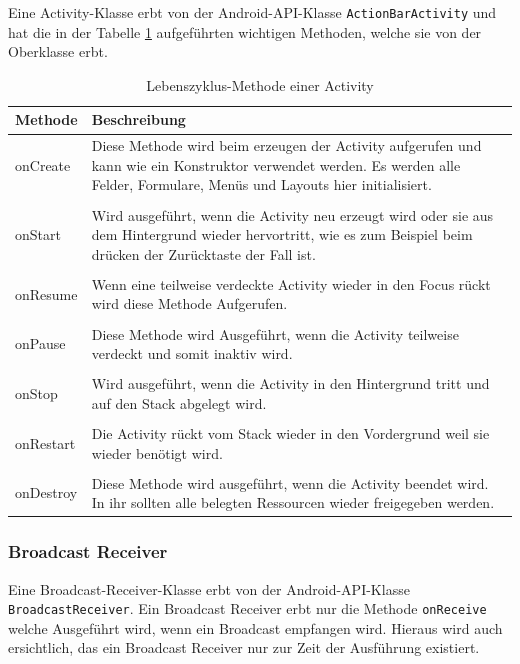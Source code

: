 Eine Activity-Klasse erbt von der Android-API-Klasse \texttt{ActionBarActivity} und hat die in der Tabelle \ref{Lebenszyklus-Methode einer Activity} aufgef\"uhrten wichtigen Methoden, welche sie von der Oberklasse erbt.

\begin{table}[!ht]
\begin{tabular}{|p{3cm}|p{12cm}|}
 \hline Methode & Beschreibung \\
 \hline onCreate & Diese Methode wird beim erzeugen der Activity aufgerufen und kann wie ein Konstruktor verwendet werden. Es werden alle Felder, Formulare, Men\"us und Layouts hier initialisiert.\\&\\
 onStart & Wird ausgef\"uhrt, wenn die Activity neu erzeugt wird oder sie aus dem Hintergrund wieder hervortritt, wie es zum Beispiel beim dr\"ucken der Zur\"ucktaste der Fall ist.\\&\\
 onResume & Wenn eine teilweise verdeckte Activity wieder in den Focus r\"uckt wird diese Methode Aufgerufen.\\&\\
 onPause & Diese Methode wird Ausgef\"uhrt, wenn die Activity teilweise verdeckt und somit inaktiv wird.\\&\\
 onStop & Wird ausgef\"uhrt, wenn die Activity in den Hintergrund tritt und auf den Stack abgelegt wird.\\&\\
 onRestart & Die Activity r\"uckt vom Stack wieder in den Vordergrund weil sie wieder ben\"otigt wird.\\&\\
 onDestroy & Diese Methode wird ausgef\"uhrt, wenn die Activity beendet wird. In ihr sollten alle belegten Ressourcen wieder freigegeben werden.\\
 \hline
\end{tabular}
\caption{Lebenszyklus-Methode einer Activity \cite{Android44}}
\label{Lebenszyklus-Methode einer Activity}
\end{table}
\FloatBarrier

\subsubsection{Broadcast Receiver} \label{Broadcast Receiver aus Programmierersicht}
Eine Broadcast-Receiver-Klasse erbt von der Android-API-Klasse \texttt{BroadcastReceiver}. Ein Broadcast Receiver erbt nur die Methode \texttt{onReceive} welche Ausgef\"uhrt wird, wenn ein Broadcast empfangen wird. Hieraus wird auch ersichtlich, das ein Broadcast Receiver nur zur Zeit der Ausf\"uhrung existiert.

